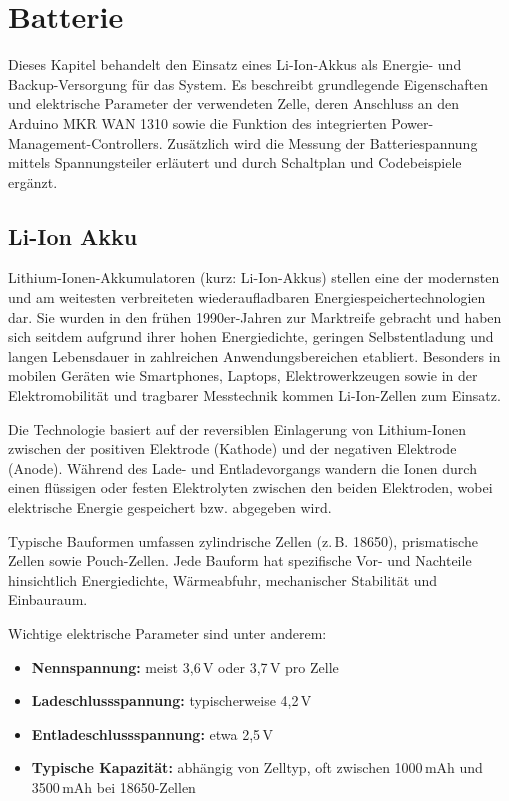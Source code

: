 %
%

\chapter{Batterie}

Dieses Kapitel behandelt den Einsatz eines Li-Ion-Akkus als Energie- und Backup-Versorgung für das System. Es beschreibt grundlegende Eigenschaften und elektrische Parameter der verwendeten Zelle, deren Anschluss an den Arduino MKR WAN 1310 sowie die Funktion des integrierten Power-Management-Controllers. Zusätzlich wird die Messung der Batteriespannung mittels Spannungsteiler erläutert und durch Schaltplan und Codebeispiele ergänzt.

\section{Li-Ion Akku}

Lithium-Ionen-Akkumulatoren (kurz: Li-Ion-Akkus) stellen eine der modernsten und am weitesten verbreiteten wiederaufladbaren Energiespeichertechnologien dar. Sie wurden in den frühen 1990er-Jahren zur Marktreife gebracht und haben sich seitdem aufgrund ihrer hohen Energiedichte, geringen Selbstentladung und langen Lebensdauer in zahlreichen Anwendungsbereichen etabliert. Besonders in mobilen Geräten wie Smartphones, Laptops, Elektrowerkzeugen sowie in der Elektromobilität und tragbarer Messtechnik kommen Li-Ion-Zellen zum Einsatz.

Die Technologie basiert auf der reversiblen Einlagerung von Lithium-Ionen zwischen der positiven Elektrode (Kathode) und der negativen Elektrode (Anode). Während des Lade- und Entladevorgangs wandern die Ionen durch einen flüssigen oder festen Elektrolyten zwischen den beiden Elektroden, wobei elektrische Energie gespeichert bzw. abgegeben wird.

Typische Bauformen umfassen zylindrische Zellen (z.\,B. 18650), prismatische Zellen sowie Pouch-Zellen. Jede Bauform hat spezifische Vor- und Nachteile hinsichtlich Energiedichte, Wärmeabfuhr, mechanischer Stabilität und Einbauraum.

Wichtige elektrische Parameter sind unter anderem:
\begin{itemize}
	\item \textbf{Nennspannung:} meist 3{,}6\,V oder 3{,}7\,V pro Zelle
	\item \textbf{Ladeschlussspannung:} typischerweise 4{,}2\,V
	\item \textbf{Entladeschlussspannung:} etwa 2{,}5\,V
	\item \textbf{Typische Kapazität:} abhängig von Zelltyp, oft zwischen 1000\,mAh und 3500\,mAh bei 18650-Zellen
\end{itemize}

